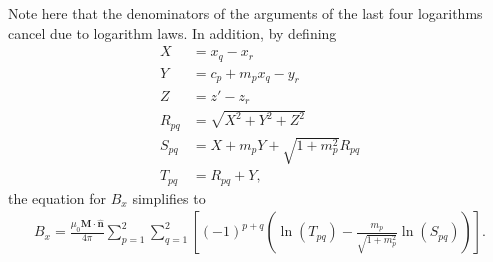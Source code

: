 \vspace{2cm}

\noindent Note here that the denominators of the arguments of the last four logarithms cancel due to logarithm laws. In addition, by defining
\begin{align}
    X &= x_q - x_r \nonumber \\
    Y &= c_p + m_px_q - y_r \nonumber \\
    Z &= z' - z_r \nonumber \\
    R_{pq} &= \sqrt{X^2 + Y^2 + Z^2} \nonumber \\
    S_{\!pq} &= X + m_pY + \sqrt{1+m_p^2}R_{pq} \nonumber \\
    T_{pq} &= R_{pq} + Y \nonumber \text{,}
\end{align}
the equation for \(B_x\) simplifies to
\begin{align}
    B_x = \frac{\mu_0\mathbf{M}\cdot\hat{\mathbf{n}}}{4\pi} \sum_{p=1}^2 \sum_{q=1}^2 \left[ \left(-1\right)^{p+q} \left( \ln \left(T_{pq} \right) - \frac{m_p}{\sqrt{1+m_p^2}} \ln \left( S_{pq} \right) \right) \right] \text{.}
\end{align}

\newpage
